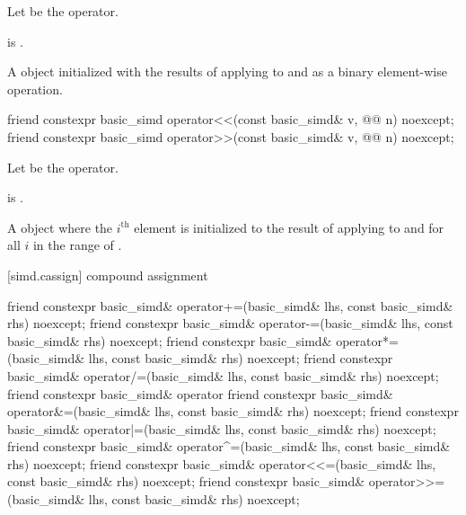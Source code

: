 \begin{itemdescr}
\pnum
Let  be the operator.

\pnum
\constraints
{} is
.

\pnum
\returns
A  object initialized with the results of applying
 to  and  as a binary element-wise
operation.
\end{itemdescr}

\begin{itemdecl}
friend constexpr basic_simd operator<<(const basic_simd& v, @@ n) noexcept;
friend constexpr basic_simd operator>>(const basic_simd& v, @@ n) noexcept;
\end{itemdecl}

\begin{itemdescr}
\pnum
Let  be the operator.

\pnum
\constraints
{} is .

\pnum
\returns
A  object where the $i^\text{th}$ element is initialized to
the result of applying  to  and  for all
$i$ in the range of .
\end{itemdescr}

[simd.cassign]{ compound assignment}

\begin{itemdecl}
friend constexpr basic_simd& operator+=(basic_simd& lhs, const basic_simd& rhs) noexcept;
friend constexpr basic_simd& operator-=(basic_simd& lhs, const basic_simd& rhs) noexcept;
friend constexpr basic_simd& operator*=(basic_simd& lhs, const basic_simd& rhs) noexcept;
friend constexpr basic_simd& operator/=(basic_simd& lhs, const basic_simd& rhs) noexcept;
friend constexpr basic_simd& operator%
friend constexpr basic_simd& operator&=(basic_simd& lhs, const basic_simd& rhs) noexcept;
friend constexpr basic_simd& operator|=(basic_simd& lhs, const basic_simd& rhs) noexcept;
friend constexpr basic_simd& operator^=(basic_simd& lhs, const basic_simd& rhs) noexcept;
friend constexpr basic_simd& operator<<=(basic_simd& lhs, const basic_simd& rhs) noexcept;
friend constexpr basic_simd& operator>>=(basic_simd& lhs, const basic_simd& rhs) noexcept;
\end{itemdecl}

